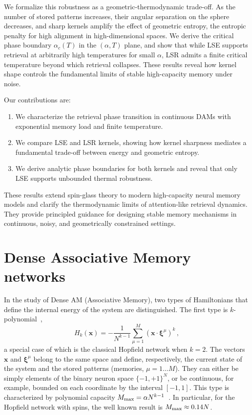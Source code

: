 \documentclass{article}
\theoremstyle{plain}
\theoremstyle{definition}
\theoremstyle{remark}
\begin{document}
We formalize this robustness as a geometric-thermodynamic trade-off. As the number of stored patterns increases, their angular separation on the sphere decreases, and sharp kernels amplify the effect of geometric entropy, the entropic penalty for high alignment in high-dimensional spaces. We derive the critical phase boundary $\alpha_c(T)$ in the $(\alpha, T)$ plane, and show that while LSE supports retrieval at arbitrarily high temperatures for small $\alpha$, LSR admits a finite critical temperature beyond which retrieval collapses. These results reveal how kernel shape controls the fundamental limits of stable high-capacity memory under noise.

Our contributions are:
\begin{enumerate}
    \item We characterize the retrieval phase transition in continuous DAMs with exponential memory load and finite temperature.
    \item We compare LSE and LSR kernels, showing how kernel sharpness mediates a fundamental trade-off between energy and geometric entropy.
    \item We derive analytic phase boundaries for both kernels and reveal that only LSE supports unbounded thermal robustness.
\end{enumerate}

These results extend spin-glass theory to modern high-capacity neural memory models and clarify the thermodynamic limits of attention-like retrieval dynamics. They provide principled guidance for designing stable memory mechanisms in continuous, noisy, and geometrically constrained settings.





\section{Dense Associative Memory networks}

In the study of Dense AM (Associative Memory), two types of Hamiltonians that define the internal energy of the system are distinguished. The first type is $k$-polynomial~\cite{krotov2016dense}, 
\begin{equation}
    H_k(\bm{x}) = - \frac{1}{N^{k-1}} \sum\limits_{\mu=1}^{M} (\bm{x} \cdot \bm{\xi}^\mu)^k\,,
    \label{eq:H_k}
\end{equation}
a special case of which is the classical Hopfield network \cite{Hopfield1982} when $k=2$. 
The vectors $\bm{x}$ and $\bm{\xi}^\mu$ belong to the same space and define, respectively, the current state of the system and the stored patterns (memories, $\mu=1\dots M$). They can either be simply elements of the binary neuron space $\{-1,+1\}^N$, or be continuous, for example, bounded on each coordinate by the interval $[-1, 1]$. This type is characterized by polynomial capacity $M_{\rm max} = \alpha N^{k-1}$~\cite{krotov2016dense}. In particular, for the Hopfield network with spins, the well known result is $M_{\rm max} \approx 0.14N$.
\end{document}
